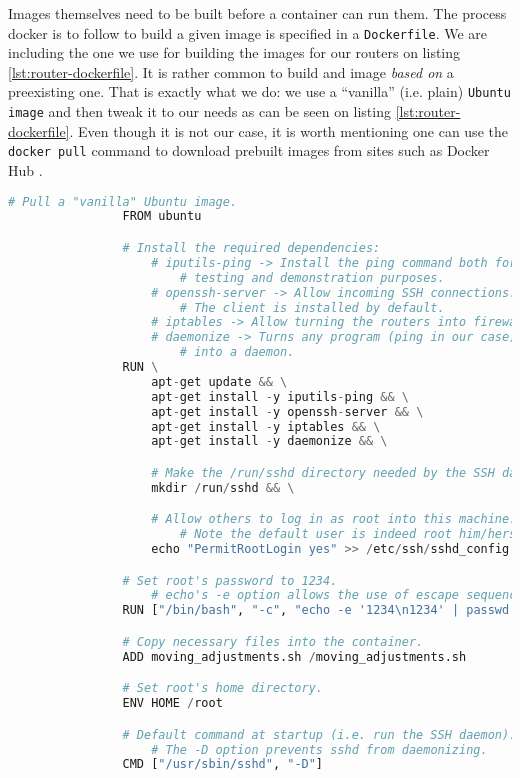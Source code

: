             Images themselves need to be built before a container can run them. The process docker is to follow to build a given image is specified in a \texttt{Dockerfile}. We are including the one we use for building the images for our routers on listing \ref{lst:router-dockerfile}. It is rather common to build and image \textit{based on} a preexisting one. That is exactly what we do: we use a ``vanilla'' (i.e. plain) \texttt{Ubuntu image} and then tweak it to our needs as can be seen on listing \ref{lst:router-dockerfile}. Even though it is not our case, it is worth mentioning one can use the \texttt{docker pull} command to download prebuilt images from sites such as Docker Hub \cite{bib:docker-hub}.\\

            \begin{lstlisting}[language = python, caption = \texttt{Dockerfile} for our virtual routers., label = lst:router-dockerfile]
                # Pull a "vanilla" Ubuntu image.
                FROM ubuntu

                # Install the required dependencies:
                    # iputils-ping -> Install the ping command both for
                        # testing and demonstration purposes.
                    # openssh-server -> Allow incoming SSH connections.
                        # The client is installed by default.
                    # iptables -> Allow turning the routers into firewalls.
                    # daemonize -> Turns any program (ping in our case)
                        # into a daemon.
                RUN \
                    apt-get update && \
                    apt-get install -y iputils-ping && \
                    apt-get install -y openssh-server && \
                    apt-get install -y iptables && \
                    apt-get install -y daemonize && \

                    # Make the /run/sshd directory needed by the SSH daemon.
                    mkdir /run/sshd && \

                    # Allow others to log in as root into this machine.
                        # Note the default user is indeed root him/herself.
                    echo "PermitRootLogin yes" >> /etc/ssh/sshd_config

                # Set root's password to 1234.
                    # echo's -e option allows the use of escape sequences (\n).
                RUN ["/bin/bash", "-c", "echo -e '1234\n1234' | passwd root"]

                # Copy necessary files into the container.
                ADD moving_adjustments.sh /moving_adjustments.sh

                # Set root's home directory.
                ENV HOME /root

                # Default command at startup (i.e. run the SSH daemon).
                    # The -D option prevents sshd from daemonizing.
                CMD ["/usr/sbin/sshd", "-D"]
            \end{lstlisting}

